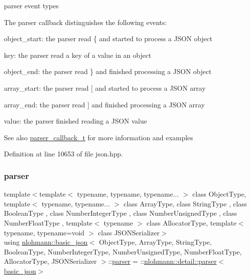 parser event types 

The parser callback distinguishes the following events\+:
\begin{DoxyItemize}
\item {\ttfamily object\+\_\+start}\+: the parser read {\ttfamily \{} and started to process a J\+S\+ON object
\item {\ttfamily key}\+: the parser read a key of a value in an object
\item {\ttfamily object\+\_\+end}\+: the parser read {\ttfamily \}} and finished processing a J\+S\+ON object
\item {\ttfamily array\+\_\+start}\+: the parser read {\ttfamily \mbox{[}} and started to process a J\+S\+ON array
\item {\ttfamily array\+\_\+end}\+: the parser read {\ttfamily \mbox{]}} and finished processing a J\+S\+ON array
\item {\ttfamily value}\+: the parser finished reading a J\+S\+ON value
\end{DoxyItemize}

 \begin{DoxySeeAlso}{See also}
\hyperlink{classnlohmann_1_1basic__json_ab4f78c5f9fd25172eeec84482e03f5b7}{parser\+\_\+callback\+\_\+t} for more information and examples 
\end{DoxySeeAlso}


Definition at line 10653 of file json.\+hpp.

\mbox{\label{classnlohmann_1_1basic__json_aba9704e82d18f8954f9925e26cec7a51}} 
\subsubsection{\texorpdfstring{parser}{parser}}
{\footnotesize\ttfamily template$<$template$<$ typename, typename, typename... $>$ class Object\+Type, template$<$ typename, typename... $>$ class Array\+Type, class String\+Type , class Boolean\+Type , class Number\+Integer\+Type , class Number\+Unsigned\+Type , class Number\+Float\+Type , template$<$ typename $>$ class Allocator\+Type, template$<$ typename, typename=void $>$ class J\+S\+O\+N\+Serializer$>$ \\
using \hyperlink{classnlohmann_1_1basic__json}{nlohmann\+::basic\+\_\+json}$<$ Object\+Type, Array\+Type, String\+Type, Boolean\+Type, Number\+Integer\+Type, Number\+Unsigned\+Type, Number\+Float\+Type, Allocator\+Type, J\+S\+O\+N\+Serializer $>$\+::\hyperlink{classnlohmann_1_1basic__json_aba9704e82d18f8954f9925e26cec7a51}{parser} =  \+::\hyperlink{classnlohmann_1_1detail_1_1parser}{nlohmann\+::detail\+::parser}$<$\hyperlink{classnlohmann_1_1basic__json}{basic\+\_\+json}$>$\hspace{0.3cm}{\ttfamily [private]}}



